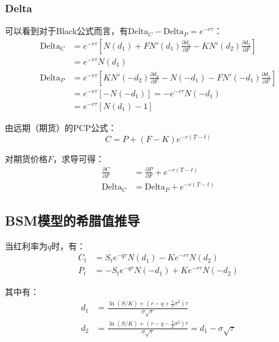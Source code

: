 \documentclass[11pt]{article}
\begin{document}
\subsubsection{Delta}

可以看到对于Black公式而言，有$\text{Delta}_C - \text{Delta}_P = e^{-r\tau}$：
\begin{align*}
    \text{Delta}_C &= e^{-r\tau}\left[N(d_1) + FN'(d_1)\frac{\partial d_1}{\partial F} - KN'(d_2)\frac{\partial d_2}{\partial F}\right] \\
    &= e^{-r\tau}N(d_1) \\
    \text{Delta}_P &= e^{-r\tau}\left[KN'(-d_2)\frac{\partial d_2}{\partial F} - N(-d_1) - FN'(-d_1)\frac{\partial d_1}{\partial F}\right] \\
    &= e^{-r\tau}\left[ -N(-d_1) \right]
    = - e^{-r\tau} N(-d_1) \\
    &= e^{-r\tau}\left[ N(d_1) -1 \right]
\end{align*}

由远期（期货）的PCP公式：
\begin{equation*}
    C = P + \left( F - K \right) e^{-r(T-t)}
\end{equation*}

对期货价格$F$，求导可得：
\begin{align*}
    \frac{\partial C}{\partial F} &= \frac{\partial P}{\partial F} + e^{-r(T-t)} \\
    \text{Delta}_{C} &= \text{Delta}_{P} + e^{-r(T-t)}
\end{align*}

\subsection{BSM模型的希腊值推导}

当红利率为$q$时，有：
\begin{align*}
    C_t &= S_te^{-q\tau}N(d_1) - Ke^{-r\tau}N(d_2) \\
    P_t &= -S_te^{-q\tau}N(-d_1) + Ke^{-r\tau}N(-d_2)
\end{align*}

其中有：
\begin{align*}
    d_1 &= \frac{\ln(S/K) + (r-q+\frac{1}{2} \sigma^2)\tau}{\sigma \sqrt{\tau}} \\
    d_2 &= \frac{\ln(S/K) + (r-q-\frac{1}{2} \sigma^2)\tau}{\sigma \sqrt{\tau}} = d_1 - \sigma \sqrt{\tau}
\end{align*}
\end{document}

